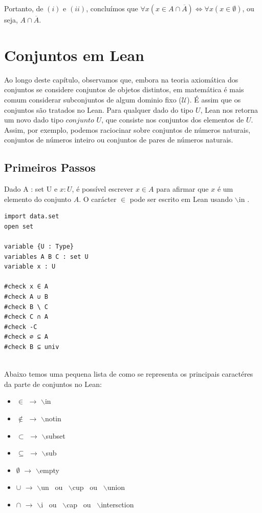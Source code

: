         Portanto, de $(i)$ e $(ii)$, concluímos que $ \forall x (x \in A \cap \overline A) \iff \forall x  (x \in \emptyset) $, ou seja, $A \cap \overline A$.
        
\section{Conjuntos em Lean}
    
    Ao longo deste capítulo, observamos que, embora na teoria axiomática dos conjuntos se considere conjuntos de objetos distintos, em matemática é mais comum considerar subconjuntos de algum dominio fixo ($\mathcal U $). É assim que os conjuntos são tratados no Lean. Para qualquer dado do tipo $U$, Lean nos retorna um novo dado tipo $conjunto$ $U$, que consiste nos conjuntos dos elementos de $U$. Assim, por exemplo, podemos raciocinar sobre conjuntos de números naturais, conjuntos de números inteiro ou conjuntos de pares de números naturais.
    
\subsection{Primeiros Passos}
    Dado {\selectfont A : set U} e $x : U$, é possível escrever $x \in A$ para afirmar que $x$ é um elemento do conjunto $A$. O carácter $\in$ pode ser escrito em Lean usando $\backslash$in .

\begin{lstlisting}
import data.set
open set

variable {U : Type}
variables A B C : set U
variable x : U

#check x ∈ A
#check A ∪ B
#check B \ C
#check C ∩ A
#check -C
#check ∅ ⊆ A
#check B ⊆ univ
    
\end{lstlisting}


Abaixo temos uma pequena lista de como se representa os principais caractéres da parte de conjuntos no Lean: 

\begin{itemize}
  
    \item $\in$ $\rightarrow$ $\backslash$in
  
    \item $\notin$ $\rightarrow$ $\backslash$notin
  
    \item $\subset$ $\rightarrow$ $\backslash$subset
  
    \item $\subseteq$ $\rightarrow$ $\backslash$sub
  
    \item $\emptyset$ $\rightarrow$ $\backslash$empty
  
    \item $\cup$ $\rightarrow$ $\backslash$un \ ou \ $\backslash$cup \ ou \ $\backslash$union
  
    \item $\cap$ $\rightarrow$ $\backslash$i \ ou \ $\backslash$cap \ ou \ $\backslash$intersction

\end{itemize}

